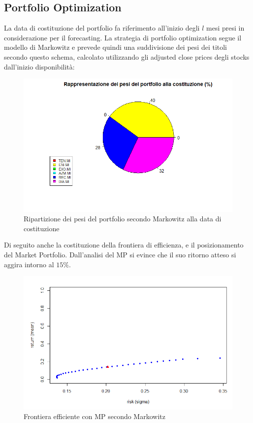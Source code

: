 \documentclass[12pt]{article}
\begin{document}
\subsection{Portfolio Optimization}
La data di costituzione del portfolio fa riferimento all'inizio degli $l$ mesi presi in considerazione per il forecasting. La strategia di portfolio optimization segue il modello di Markowitz e prevede quindi una suddivisione dei pesi dei titoli secondo questo schema, calcolato utilizzando gli adjusted close prices degli stocks dall'inizio disponibilità:
\begin{figure}[!htb]
    \centering
    \includegraphics[width=1\textwidth]{immagini/weights.png}
    \caption{Ripartizione dei pesi del portfolio secondo Markowitz alla data di costituzione}
\end{figure}
\FloatBarrier
Di seguito anche la costituzione della frontiera di efficienza, e il posizionamento del Market Portfolio. Dall'analisi del MP si evince che il suo ritorno atteso si aggira intorno al $15\%$.
\begin{figure}[!htb]
    \centering
    \includegraphics[width=1\textwidth]{immagini/frontiera.png}
    \caption{Frontiera efficiente con MP secondo Markowitz}
\end{figure}
\FloatBarrier
\end{document}

